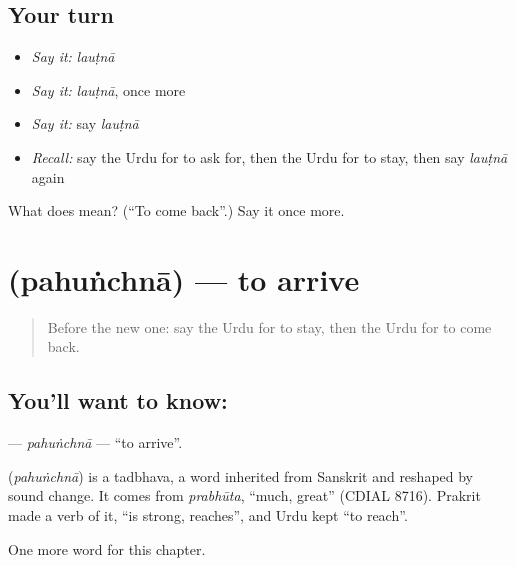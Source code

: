 \subsection*{Your turn}
\begin{itemize}
\raggedright
  \item \emph{Say it:} \emph{lauṭnā}
  \item \emph{Say it:} \emph{lauṭnā}, once more
  \item \emph{Say it:} say \emph{lauṭnā}
  \item \emph{Recall:} say the Urdu for to ask for, then the Urdu for to stay, then say \emph{lauṭnā} again
\end{itemize}

\begin{tcolorbox}[breakable,colback=teal!4,colframe=teal!35!black,title={Before you move on}]
What does  mean? (\textquotedblleft{}To come back\textquotedblright{}.) Say it once more.
\end{tcolorbox}
\section[\texorpdfstring{\ur{پہنچنا} (pahuṅchnā)}{پہنچنا (pahuṅchnā)}]{ (pahuṅchnā) — to arrive}

\label{lesson:UR-C141-pahunchna}



\begin{quote}
Before the new one: say the Urdu for to stay, then the Urdu for to come back.
\end{quote}

\subsection*{You'll want to know: }
\textbf{} — \emph{pahuṅchnā} — \textquotedblleft{}to arrive\textquotedblright{}.

\begin{cousinweb}
\textbf{} (\emph{pahuṅchnā}) is a tadbhava, a word inherited from Sanskrit and reshaped by sound change. It comes from \emph{prabhūta}, \textquotedblleft{}much, great\textquotedblright{} (CDIAL 8716). Prakrit made a verb of it, \textquotedblleft{}is strong, reaches\textquotedblright{}, and Urdu kept \textquotedblleft{}to reach\textquotedblright{}.
\end{cousinweb}

\begin{grammarlens}[title={What you've built}]
One more word for this chapter.
\end{grammarlens}

